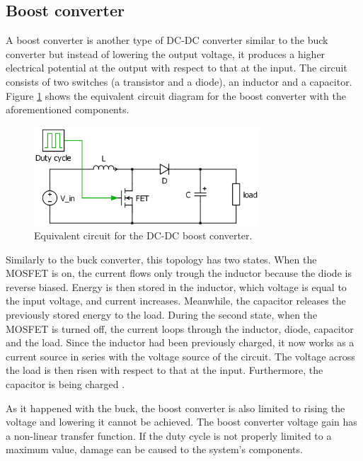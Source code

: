 \subsection{Boost converter\label{Boost-C}}

A boost converter is another type of DC-DC converter similar to the buck converter but instead of lowering the output voltage, it produces a higher electrical potential at the output with respect to that at the input. 
The circuit consists of two switches (a transistor and a diode), an inductor and a capacitor. Figure \ref{Boost-converter} shows the equivalent circuit diagram for the boost converter with the aforementioned components. %

\begin{figure}[H]
	\begin{center}
		\includegraphics[width=0.75\textwidth]{../Pictures/Boost-converter}
		\caption{Equivalent circuit for the DC-DC boost converter.}
		\label{Boost-converter}
	\end{center}	
\end{figure}

\vspace{1cm}
Similarly to the buck converter, this topology has two states. When the MOSFET is on, the current flows only trough the inductor because the diode  is reverse biased. Energy is then stored in the inductor, which voltage is equal to the input voltage, and current increases. Meanwhile, the capacitor releases the previously stored energy to the load.
During the second state, when the MOSFET is turned off, the current loops through the inductor, diode, capacitor and the load. Since the inductor had been previously charged, it now works as a current source in series with the voltage source of the circuit. The voltage across the load is then risen with respect to that at the input. Furthermore, the capacitor is being charged \cite{schematicbuckandboost}. 

As it happened with the buck, the boost converter is also limited to rising the voltage and lowering it cannot be achieved. The boost converter voltage gain has a non-linear transfer function.  If the duty cycle is not properly limited to a maximum value, damage can be caused to the system's components. \cite{advantagebuckboost}
 

